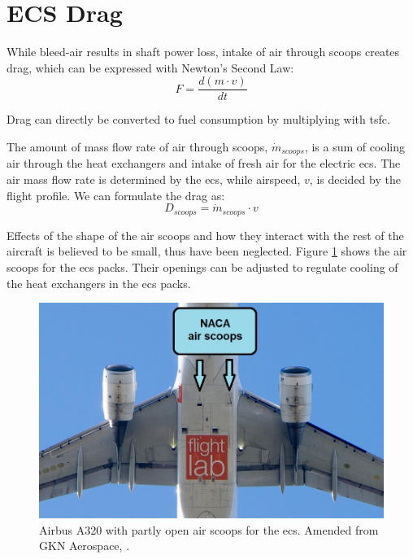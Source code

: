 \documentclass[english]{kththesis}
\begin{document}
\section{ECS Drag}
\label{sec:ECSdrag}

While bleed-air results in shaft power loss, intake of air through scoops creates drag, which can be expressed with Newton's Second Law:
\begin{equation}
\label{Newton2Law}
F = \frac{d(m\cdot v)}{dt}
\end{equation}

Drag can directly be converted to fuel consumption by multiplying with \acrshort{tsfc}.

The amount of mass flow rate of air through scoops, $\dot m_{scoops}$, is a sum of cooling air through the heat exchangers and intake of fresh air for the electric \acrshort{ecs}. The air mass flow rate is determined by the \acrshort{ecs}, while airspeed, $v$, is decided by the flight profile. We can formulate the drag as:
\begin{equation}
\label{ScoopDrag}
D_{scoops} = \dot m_{scoops} \cdot v 
\end{equation}

Effects of the shape of the air scoops and how they interact with the rest of the aircraft is believed to be small, thus have been neglected.
Figure \ref{fig:A320Scoops} shows the air scoops for the \acrshort{ecs} packs. Their openings can be adjusted to regulate cooling of the heat exchangers in the \acrshort{ecs} packs.

\begin{figure}[!ht]
    \centering
    \includegraphics[width=1\textwidth]{Epictures/A320_Scoops_closer.jpg}
    \caption{Airbus A320 with partly open air scoops for the \acrshort{ecs}. Amended from GKN Aerospace, \cite{GKN2020}.}
    \label{fig:A320Scoops}
\end{figure}
\end{document}
